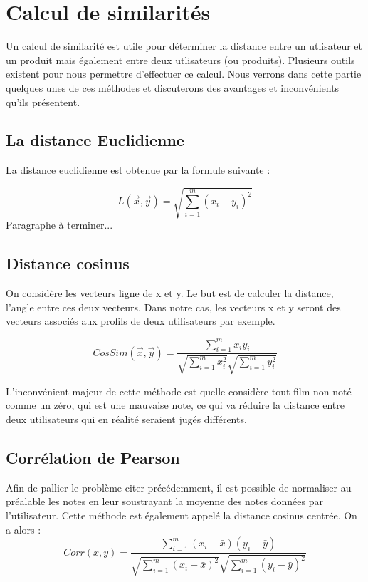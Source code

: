 \documentclass{report}
\begin{document}
\section{Calcul de similarités}
Un calcul de similarité est utile pour déterminer la distance entre un utlisateur et un produit mais également entre deux utlisateurs (ou produits).
Plusieurs outils existent pour nous permettre d'effectuer ce calcul.
Nous verrons dans cette partie quelques unes de ces méthodes et discuterons des avantages et inconvénients qu'ils présentent.

\subsection{La distance Euclidienne}
La distance euclidienne est obtenue par la formule suivante :

\begin{equation}
    L(\vec{x}, \vec{y}) = \sqrt{\sum_{i=1}^m (x_i - y_i)^2}
\end{equation}
Paragraphe à terminer...

\subsection{Distance cosinus}
On considère les vecteurs ligne de x et y. Le but est de calculer la distance, l’angle entre ces deux vecteurs. Dans notre cas, les vecteurs x et y seront des vecteurs associés aux profils de deux utilisateurs par exemple.

\begin{equation}
    CosSim(\vec{x}, \vec{y}) = \frac{\sum_{i=1}^m x_i y_i}{\sqrt{\sum_{i=1}^m x_i ^2}\sqrt{\sum_{i=1}^m y_i ^2}}
\end{equation}

L'inconvénient majeur de cette méthode est quelle considère tout film non noté comme un zéro, qui est une mauvaise note, ce qui va réduire la distance entre deux utilisateurs qui en réalité seraient jugés différents.

\subsection{Corrélation de Pearson}
Afin de pallier le problème citer précédemment, il est possible de normaliser au préalable les notes en leur soustrayant la moyenne des notes données par l'utilisateur. Cette méthode est également appelé la distance cosinus centrée.
On a alors :
\begin{equation}
  Corr(x, y) = \frac{\sum_{i=1}^m (x_i - \bar{x})(y_i - \bar{y})}{\sqrt{\sum_{i=1}^m (x_i - \bar{x})^2}\sqrt{\sum_{i=1}^m (y_i - \bar{y})^2}}
\end{equation}
\end{document}
